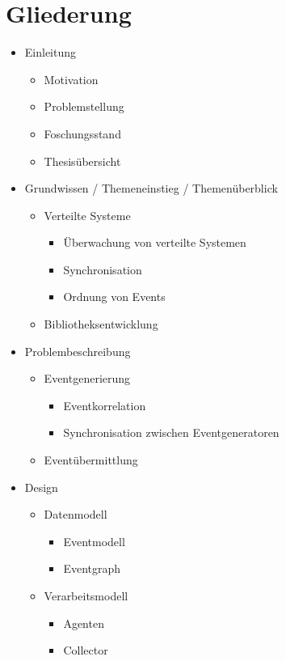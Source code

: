 \documentclass[a4paper]{article}
\begin{document}
\section{Gliederung}
\begin{itemize}
	\item Einleitung
		\begin{itemize}
			\item Motivation
			\item Problemstellung
			\item Foschungsstand
			\item Thesisübersicht
		\end{itemize}
	\item Grundwissen / Themeneinstieg / Themenüberblick
		\begin{itemize}
			\item Verteilte Systeme
			\begin{itemize}
				\item Überwachung von verteilte Systemen
				\item Synchronisation
				\item Ordnung von Events
			\end{itemize}
			\item Bibliotheksentwicklung
		\end{itemize}
	\item Problembeschreibung
		\begin{itemize}
			\item Eventgenerierung
			\begin{itemize}
				\item Eventkorrelation
				\item Synchronisation zwischen Eventgeneratoren
			\end{itemize}
			\item Eventübermittlung
		\end{itemize}
	\item Design
	\begin{itemize}
		\item Datenmodell
		\begin{itemize}
			\item Eventmodell
			\item Eventgraph
		\end{itemize}
		\item Verarbeitsmodell
		\begin{itemize}
			\item Agenten
			\item Collector
		\end{itemize}

\end{itemize}
\end{itemize}
\end{document}
